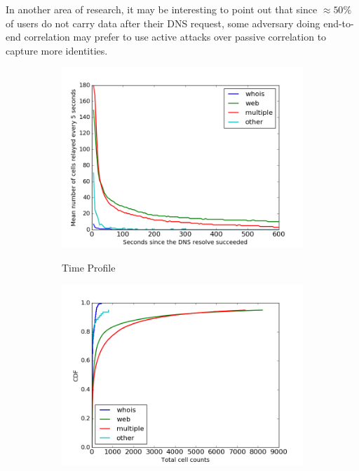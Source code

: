 In another area of research, it may be interesting to point out that since $\approx 50\%$ of users do not carry data after their DNS request, some adversary doing end-to-end correlation may prefer to use active attacks over passive correlation to capture more identities.


\begin{figure}
	\centering
	\begin{subfigure}[t]{0.32\textwidth}
		\centering
		\includegraphics[scale=0.3]{images/exitmeasurement.png}
		\label{fig:stats_a}
		\caption{Time Profile}
	\end{subfigure}
	\begin{subfigure}[t]{0.32\textwidth}
		\centering
		\includegraphics[scale=0.3]{images/totcellcountscdf.png}

\end{subfigure}
\end{figure}
